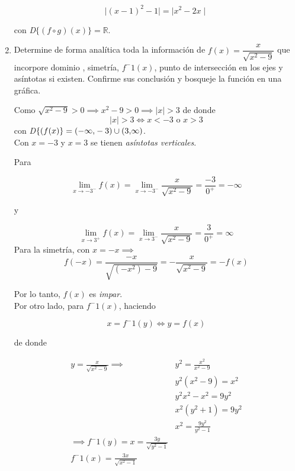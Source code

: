 \documentclass[a4paper,12pt]{report}
\begin{document}
\begin{enumerate}
\[ \mid (x-1)^2 -1\mid = \mid x^2 -2x \mid\]

con \emph{D}$\{ (f \circ g)(x) \} = \mathds{R} $.\\


\newpage


\item Determine de forma analítica toda la información de $f(x) = \dfrac{x}{\sqrt{x^2 -9}}$ que incorpore dominio , simetría, $f^-1(x)$, punto de intersección en los ejes y asíntotas si existen. Confirme sus conclusión y bosqueje la función en una gráfica.\\
\vspace{0.5cm}

Como $\sqrt{x^2 - 9} > 0 \implies x^2 -9 >0 \implies \mid x \mid >3$
de donde 
\[\mid x \mid >3 \iff x<-3 \text{ o } x>3\]
con \emph{D}$\{ (f(x) \} = \interval({-\infty,-3}) \cup \interval({3,\infty}) $.\\
\vspace{0.5cm}
Con $x = -3$ y $x=3$ se tienen \emph{asíntotas verticales}.
\vspace{0.5cm}

Para 	

\[
	\lim_{x \to -3^-} f(x) = \lim_{x \to -3^-} \frac{x}{\sqrt{x^2 -9}} = \frac{-3}{0^+} = -\infty
\]

y

\[
	\lim_{x \to 3^+} f(x) = \lim_{x \to 3^-} \frac{x}{\sqrt{x^2 -9}} = \frac{3}{0^+} = \infty
\]
Para la simetría, con $x=-x \implies $\\

\[
	f(-x) = \frac{-x}{\sqrt{(-x^2) -9}} = -\frac{x}{\sqrt{x^2 -9}} = -f(x)
\]

Por lo tanto, $f(x)$ es \emph{impar}.\\

Por otro lado, para $f^-1(x)$, haciendo

\[x = f^-1 (y) \iff y = f(x)\]

de donde 

\begin{align*}
y = \frac{x}{\sqrt{x^2 -9}} \implies & y^2 = \frac{x^2}{x^2 -9}
\\ & y^2 (x^2 -9) = x^2
\\ & y^2 x^2 - x^2 = 9y^2
\\ & x^2 (y^2 +1)  = 9y^2
\\ & x^2 = \frac{9y^2}{y^2 -1}\\
\implies  f^-1 (y) = x = \frac{3y}{\sqrt{y^2 -1}} \\
 f^-1(x) = \frac{3x}{\sqrt{x^2 -1}}
\end{align*}


\end{enumerate}
\end{document}

